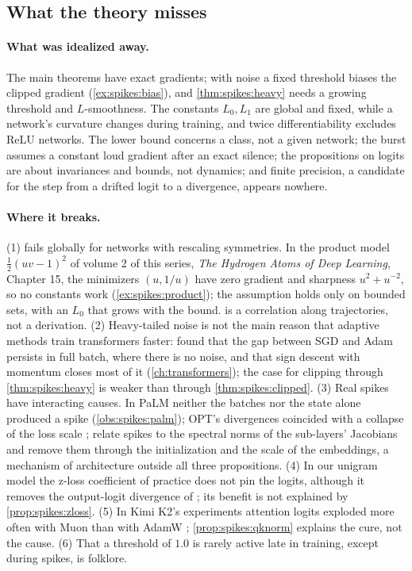 \begin{refsection}
\section{What the theory misses}\label{sec:spikes:misses}

\paragraph{What was idealized away.} The main theorems have exact gradients; with noise a fixed threshold biases the clipped gradient (\cref{ex:spikes:bias}), and \cref{thm:spikes:heavy} needs a growing threshold and $L$-smoothness. The constants $L_0,L_1$ are global and fixed, while a network's curvature changes during training, and twice differentiability excludes ReLU networks. The lower bound concerns a class, not a given network; the burst assumes a constant loud gradient after an exact silence; the propositions on logits are about invariances and bounds, not dynamics; and finite precision, a candidate for the step from a drifted logit to a divergence, appears nowhere.

\paragraph{Where it breaks.} (1)  fails globally for networks with rescaling symmetries. In the product model $\frac12(uv-1)^2$ of volume 2 of this series, \emph{The Hydrogen Atoms of Deep Learning}, Chapter 15, the minimizers $(u,1/u)$ have zero gradient and sharpness $u^2+u^{-2}$, so no constants work (\cref{ex:spikes:product}); the assumption holds only on bounded sets, with an $L_0$ that grows with the bound.  is a correlation along trajectories, not a derivation. (2) Heavy-tailed noise is not the main reason that adaptive methods train transformers faster: \textcite{KunstnerEtAl2023} found that the gap between SGD and Adam persists in full batch, where there is no noise, and that sign descent with momentum closes most of it (\cref{ch:transformers}); the case for clipping through \cref{thm:spikes:heavy} is weaker than through \cref{thm:spikes:clipped}. (3) Real spikes have interacting causes. In PaLM neither the batches nor the state alone produced a spike (\cref{obs:spikes:palm}); OPT's divergences coincided with a collapse of the loss scale \parencite{ZhangEtAl2022OPT}; \textcite{TakaseEtAl2025} relate spikes to the spectral norms of the sub-layers' Jacobians and remove them through the initialization and the scale of the embeddings, a mechanism of architecture outside all three propositions. (4) In our unigram model the z-loss coefficient of practice does not pin the logits, although it removes the output-logit divergence of \textcite{WortsmanEtAl2024}; its benefit is not explained by \cref{prop:spikes:zloss}. (5) In Kimi K2's experiments attention logits exploded more often with Muon than with AdamW \parencite{KimiTeam2025}; \cref{prop:spikes:qknorm} explains the cure, not the cause. (6) That a threshold of $1.0$ is rarely active late in training, except during spikes, is folklore.


\end{refsection}
